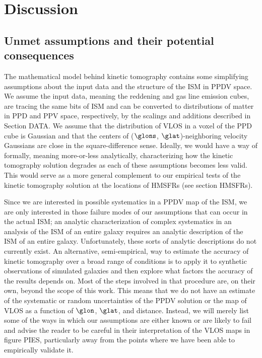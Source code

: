 \section{Discussion}
\label{sec:discussion}

\subsection{Unmet assumptions and their potential consequences}
\label{sec:discussion-systematics}
The mathematical model behind kinetic tomography contains some simplifying assumptions about the input data and the structure of the ISM in PPDV space. 
We assume the input data, meaning the reddening and gas line emission cubes, are tracing the same bits of ISM and can be converted to distributions of matter in PPD and PPV space, respectively, by the scalings and additions described in Section DATA.
We assume that the distribution of VLOS in a voxel of the PPD cube is Gaussian and that the centers of ($\glons$, $\glat$)-neighboring velocity Gaussians are close in the square-difference sense. 
Ideally, we would have a way of formally, meaning more-or-less analytically, characterizing how the kinetic tomography solution degrades as each of these assumptions becomes less valid.
This would serve as a more general complement to our empirical tests of the kinetic tomography solution at the locations of HMSFRs (see section HMSFRs).

Since we are interested in possible systematics in a PPDV map of the ISM, we are only interested in those failure modes of our assumptions that can occur in the actual ISM; an analytic characterization of complex systematics in an analysis of the ISM of an entire galaxy requires an analytic description of the ISM of an entire galaxy.
Unfortunately, these sorts of analytic descriptions do not currently exist.
An alternative, semi-empirical, way to estimate the accuracy of kinetic tomography over a broad range of conditions is to apply it to synthetic observations of simulated galaxies and then explore what factors the accuracy of the results depends on. 
Most of the steps involved in that procedure are, on their own, beyond the scope of this work. 
This means that we do not have an estimate of the systematic or random uncertainties of the PPDV solution or the map of VLOS as a function of $\glon$, $\glat$, and distance. 
Instead, we will merely list some of the ways in which our assumptions are either known or are likely to fail and advise the reader to be careful in their interpretation of the VLOS maps in figure PIES, particularly away from the points where we have been able to empirically validate it.

